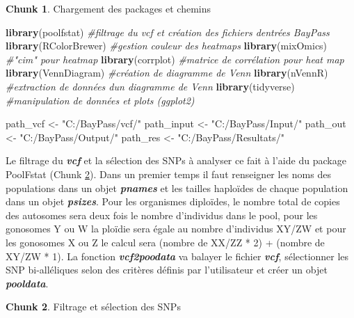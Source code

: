 \documentclass[
  openany]{book}
\newenvironment{Shaded}{\begin{snugshade}}{\end{snugshade}}
\newcommand{\CommentTok}[1]{\textcolor[rgb]{0.56,0.35,0.01}{\textit{#1}}}
\newcommand{\FunctionTok}[1]{\textcolor[rgb]{0.13,0.29,0.53}{\textbf{#1}}}
\newcommand{\NormalTok}[1]{#1}
\newcommand{\OtherTok}[1]{\textcolor[rgb]{0.56,0.35,0.01}{#1}}
\newcommand{\StringTok}[1]{\textcolor[rgb]{0.31,0.60,0.02}{#1}}
\theoremstyle{definition}
\theoremstyle{definition}
\theoremstyle{definition}
\newtheorem{exercise}{Chunk}[chapter]
\theoremstyle{definition}
\theoremstyle{remark}
\begin{document}
\begin{exercise}
\protect\hypertarget{exr:chunk1}{}\label{exr:chunk1}{Chargement des packages et chemins}
\end{exercise}

\begin{Shaded}
\begin{Highlighting}[]
\FunctionTok{library}\NormalTok{(poolfstat)      }\CommentTok{\#filtrage du vcf et création des fichiers d\textquotesingle{}entrées BayPass}
\FunctionTok{library}\NormalTok{(RColorBrewer)   }\CommentTok{\#gestion couleur des heatmaps}
\FunctionTok{library}\NormalTok{(mixOmics)       }\CommentTok{\#"cim" pour heatmap}
\FunctionTok{library}\NormalTok{(corrplot)       }\CommentTok{\#matrice de corrélation pour heat map}
\FunctionTok{library}\NormalTok{(VennDiagram)    }\CommentTok{\#création de diagramme de Venn}
\FunctionTok{library}\NormalTok{(nVennR)         }\CommentTok{\#extraction de données d\textquotesingle{}un diagramme de Venn}
\FunctionTok{library}\NormalTok{(tidyverse)      }\CommentTok{\#manipulation de données et plots (ggplot2)}

\NormalTok{path\_vcf }\OtherTok{\textless{}{-}} \StringTok{"C:/BayPass/vcf/"}
\NormalTok{path\_input }\OtherTok{\textless{}{-}} \StringTok{"C:/BayPass/Input/"}
\NormalTok{path\_out }\OtherTok{\textless{}{-}} \StringTok{"C:/BayPass/Output/"}
\NormalTok{path\_res }\OtherTok{\textless{}{-}} \StringTok{"C:/BayPass/Resultats/"}
\end{Highlighting}
\end{Shaded}

Le filtrage du \textbf{\emph{vcf}} et la sélection des SNPs à analyser ce fait à l'aide du package PoolFstat (Chunk \ref{exr:chunk2}). Dans un premier temps il faut renseigner les noms des populations dans un objet \textbf{\emph{pnames}} et les tailles haploïdes de chaque population dans un objet \textbf{\emph{psizes}}. Pour les organismes diploïdes, le nombre total de copies des autosomes sera deux fois le nombre d'individus dans le pool, pour les gonosomes Y ou W la ploïdie sera égale au nombre d'individus XY/ZW et pour les gonosomes X ou Z le calcul sera (nombre de XX/ZZ * 2) + (nombre de XY/ZW * 1).
La fonction \textbf{\emph{vcf2poodata}} va balayer le fichier \textbf{\emph{vcf}}, sélectionner les SNP bi-alléliques selon des critères définis par l'utilisateur et créer un objet \textbf{\emph{pooldata}}.

\begin{exercise}
\protect\hypertarget{exr:chunk2}{}\label{exr:chunk2}{Filtrage et sélection des SNPs}
\end{exercise}
\end{document}
